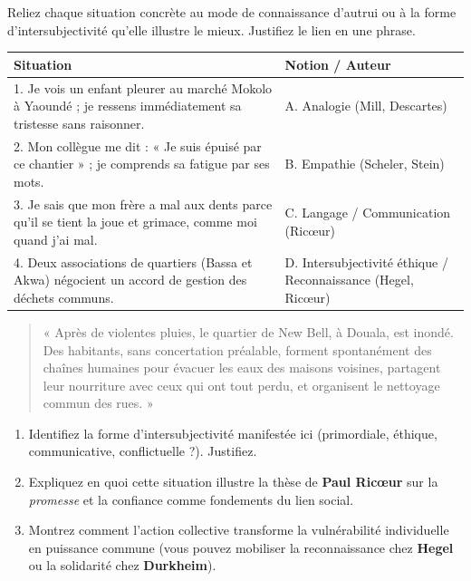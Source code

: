 \documentclass[11pt]{article}
\newcounter{popsec}
\newcounter{popsub}
\newcommand{\courssub}[1]{%
  \stepcounter{popsub}%
  \par\vspace{9pt}\noindent{\popxbold\fontsize{11.5}{13}\selectfont\color{popink}{\color{poporange}\thepopsec.\thepopsub}\hspace{6pt}#1}\par\nopagebreak\vspace{4pt}
}
\begin{document}
\begin{exercice}
Reliez chaque situation concrète au mode de connaissance d'autrui ou à la forme d'intersubjectivité qu'elle illustre le mieux. Justifiez le lien en une phrase.
\begin{center}
\begin{tabularx}{\linewidth}{|X|l|}\hline
\rowcolor{popblueL}\textbf{Situation} & \textbf{Notion / Auteur} \\ \hline
1. Je vois un enfant pleurer au marché Mokolo à Yaoundé ; je ressens immédiatement sa tristesse sans raisonner. & A. Analogie (Mill, Descartes) \\ \hline
2. Mon collègue me dit : « Je suis épuisé par ce chantier » ; je comprends sa fatigue par ses mots. & B. Empathie (Scheler, Stein) \\ \hline
3. Je sais que mon frère a mal aux dents parce qu'il se tient la joue et grimace, comme moi quand j'ai mal. & C. Langage / Communication (Ricœur) \\ \hline
4. Deux associations de quartiers (Bassa et Akwa) négocient un accord de gestion des déchets communs. & D. Intersubjectivité éthique / Reconnaissance (Hegel, Ricœur) \\ \hline
\end{tabularx}
\end{center}
\end{exercice}

\courssub{Je m'entraîne}

\begin{exercice}
\begin{quote}
« Après de violentes pluies, le quartier de New Bell, à Douala, est inondé. Des habitants, sans concertation préalable, forment spontanément des chaînes humaines pour évacuer les eaux des maisons voisines, partagent leur nourriture avec ceux qui ont tout perdu, et organisent le nettoyage commun des rues. »
\end{quote}
\begin{enumerate}
    \item Identifiez la forme d'intersubjectivité manifestée ici (primordiale, éthique, communicative, conflictuelle ?). Justifiez.
    \item Expliquez en quoi cette situation illustre la thèse de \textbf{Paul Ricœur} sur la \emph{promesse} et la confiance comme fondements du lien social.
    \item Montrez comment l'action collective transforme la vulnérabilité individuelle en puissance commune (vous pouvez mobiliser la reconnaissance chez \textbf{Hegel} ou la solidarité chez \textbf{Durkheim}).
\end{enumerate}
\end{exercice}
\end{document}
